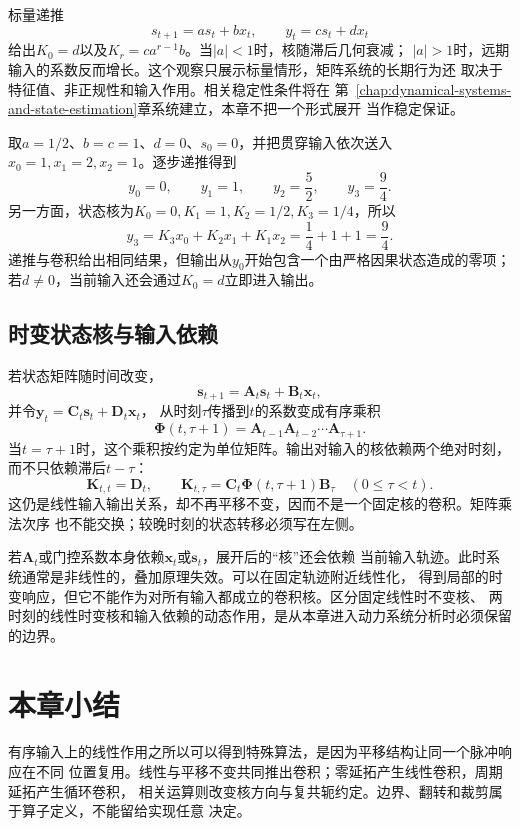 标量递推
\[
  s_{t+1}=as_t+bx_t,\qquad y_t=cs_t+dx_t
\]
给出$K_0=d$以及$K_r=ca^{r-1}b$。当$|a|<1$时，核随滞后几何衰减；
$|a|>1$时，远期输入的系数反而增长。这个观察只展示标量情形，矩阵系统的长期行为还
取决于特征值、非正规性和输入作用。相关稳定性条件将在
第~\ref{chap:dynamical-systems-and-state-estimation}章系统建立，本章不把一个形式展开
当作稳定保证。

取$a=1/2$、$b=c=1$、$d=0$、$s_0=0$，并把贯穿输入依次送入
$x_0=1,x_1=2,x_2=1$。逐步递推得到
\[
  y_0=0,\qquad y_1=1,\qquad y_2=\frac{5}{2},\qquad y_3=\frac{9}{4}.
\]
另一方面，状态核为$K_0=0,K_1=1,K_2=1/2,K_3=1/4$，所以
\[
  y_3=K_3x_0+K_2x_1+K_1x_2
  =\frac{1}{4}+1+1=\frac{9}{4}.
\]
递推与卷积给出相同结果，但输出从$y_0$开始包含一个由严格因果状态造成的零项；
若$d\neq0$，当前输入还会通过$K_0=d$立即进入输出。

\subsection{时变状态核与输入依赖}

若状态矩阵随时间改变，
\[
  \bm{s}_{t+1}
  =
  \bm{A}_t\bm{s}_t+\bm{B}_t\bm{x}_t,
\]
并令$\bm{y}_t=\bm{C}_t\bm{s}_t+\bm{D}_t\bm{x}_t$，
从时刻$\tau$传播到$t$的系数变成有序乘积
\[
  \bm{\Phi}(t,\tau+1)
  =
  \bm{A}_{t-1}\bm{A}_{t-2}\cdots\bm{A}_{\tau+1}.
\]
当$t=\tau+1$时，这个乘积按约定为单位矩阵。输出对输入的核依赖两个绝对时刻，
而不只依赖滞后$t-\tau$：
\[
  \bm{K}_{t,t}=\bm{D}_t,\qquad
  \bm{K}_{t,\tau}
  =
  \bm{C}_t\bm{\Phi}(t,\tau+1)\bm{B}_{\tau}
  \quad(0\leq\tau<t).
\]
这仍是线性输入输出关系，却不再平移不变，因而不是一个固定核的卷积。矩阵乘法次序
也不能交换；较晚时刻的状态转移必须写在左侧。

若$\bm{A}_t$或门控系数本身依赖$\bm{x}_t$或$\bm{s}_t$，展开后的“核”还会依赖
当前输入轨迹。此时系统通常是非线性的，叠加原理失效。可以在固定轨迹附近线性化，
得到局部的时变响应，但它不能作为对所有输入都成立的卷积核。区分固定线性时不变核、
两时刻的线性时变核和输入依赖的动态作用，是从本章进入动力系统分析时必须保留的边界。

\section{本章小结}
\label{sec:signal-analysis-summary}

有序输入上的线性作用之所以可以得到特殊算法，是因为平移结构让同一个脉冲响应在不同
位置复用。线性与平移不变共同推出卷积；零延拓产生线性卷积，周期延拓产生循环卷积，
相关运算则改变核方向与复共轭约定。边界、翻转和裁剪属于算子定义，不能留给实现任意
决定。

